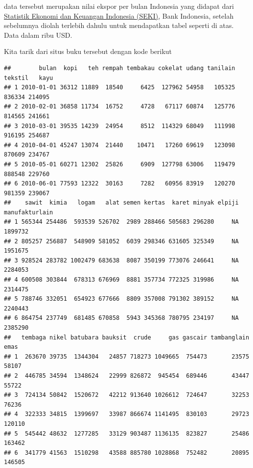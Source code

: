 \documentclass[
]{book}
\newenvironment{Shaded}{\begin{snugshade}}{\end{snugshade}}
\newcommand{\CommentTok}[1]{\textcolor[rgb]{0.56,0.35,0.01}{\textit{#1}}}
\newcommand{\KeywordTok}[1]{\textcolor[rgb]{0.13,0.29,0.53}{\textbf{#1}}}
\newcommand{\NormalTok}[1]{#1}
\newcommand{\OperatorTok}[1]{\textcolor[rgb]{0.81,0.36,0.00}{\textbf{#1}}}
\newcommand{\StringTok}[1]{\textcolor[rgb]{0.31,0.60,0.02}{#1}}
\begin{document}
data tersebut merupakan nilai ekspor per bulan Indonesia yang didapat dari \href{https://www.bi.go.id/id/statistik/seki/terkini/eksternal/Contents/Default.aspx}{Statistik Ekonomi dan Keuangan Indonesia (SEKI)}, Bank Indonesia, setelah sebelumnya diolah terlebih dahulu untuk mendapatkan tabel seperti di atas. Data dalam ribu USD.

Kita tarik dari situs buku tersebut dengan kode berikut

\begin{Shaded}
\end{Shaded}

\begin{verbatim}
##        bulan  kopi   teh rempah tembakau cokelat udang tanilain tekstil   kayu
## 1 2010-01-01 36312 11889  18540     6425  127962 54958   105325  836334 214095
## 2 2010-02-01 36858 11734  16752     4728   67117 60874   125776  814565 241661
## 3 2010-03-01 39535 14239  24954     8512  114329 68049   111998  916195 254687
## 4 2010-04-01 45247 13074  21440    10471   17260 69619   123098  870609 234767
## 5 2010-05-01 60271 12302  25826     6909  127798 63006   119479  888548 229760
## 6 2010-06-01 77593 12322  30163     7282   60956 83919   120270  981359 239067
##    sawit  kimia   logam   alat semen kertas  karet minyak elpiji manufakturlain
## 1 565344 254486  593539 526702  2989 288466 505683 296280     NA        1899732
## 2 805257 256887  548909 581052  6039 298346 631605 325349     NA        1951675
## 3 928524 283782 1002479 683638  8087 350199 773076 246641     NA        2284053
## 4 600508 303844  678313 676969  8881 357734 772325 319986     NA        2314475
## 5 788746 332051  654923 677666  8809 357008 791302 389152     NA        2240443
## 6 864754 237749  681485 670858  5943 345368 780795 234197     NA        2385290
##   tembaga nikel batubara bauksit  crude     gas gascair tambanglain   emas
## 1  263670 39735  1344304   24857 718273 1049665  754473       23575  58107
## 2  446785 34594  1348624   22999 826872  945454  689446       43447  55722
## 3  724134 50842  1520672   42212 913640 1026612  724647       32253  76236
## 4  322333 34815  1399697   33987 866674 1141495  830103       29723 120110
## 5  545442 48632  1277285   33129 903487 1136135  823827       25486 163462
## 6  341779 41563  1510298   43588 885780 1028868  752482       20895 146505
\end{verbatim}
\end{document}
